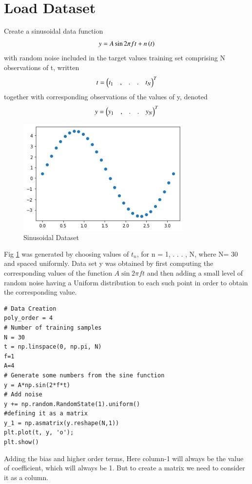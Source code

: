 \documentclass[journal,12pt,twocolumn]{IEEEtran}
\begin{document}
\section{Load Dataset}
Create a sinusoidal data function
\begin{align}
    y = A\sin{2\pi{ft}}+n\left(t\right)
\end{align}
with random noise included in the target values training set comprising N observations of t,
written
\begin{align}
    t=\begin{pmatrix}t_1 &,&.&.& t_N\end{pmatrix}^T 
\end{align}
together with corresponding observations of the values
of y, denoted 
\begin{align}
    y=\begin{pmatrix}y_1 &,&.&.& y_N\end{pmatrix}^T
\end{align}
\begin{figure}[!h]
\begin{center}
\includegraphics[width=3.4in]{a1.png}
\end{center}
\caption{Sinusoidal Dataset}
\label{fig:1}
\end{figure}
Fig \ref{fig:1} was generated by choosing
values of $t_n$, for n = 1, . . . , N, where N= 30 and spaced uniformly. Data set y was obtained by first computing the corresponding values of the function $A\sin2\pi{ft}$ and then adding a small level of random noise having a Uniform distribution to each such point in order to obtain the corresponding value.
\begin{lstlisting}
# Data Creation
poly_order = 4
# Number of training samples
N = 30
t = np.linspace(0, np.pi, N)
f=1
A=4
# Generate some numbers from the sine function
y = A*np.sin(2*f*t)
# Add noise
y += np.random.RandomState(1).uniform()
#defining it as a matrix
y_1 = np.asmatrix(y.reshape(N,1))
plt.plot(t, y, 'o');
plt.show()
\end{lstlisting}
Adding the bias and higher order terms,
Here column-1 will always be the value of coefficient, which will always be 1. But to create a matrix we need to consider it as a column.
\end{document}
